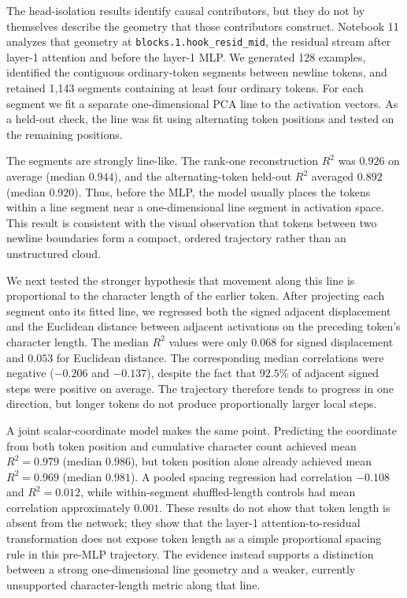 \documentclass[11pt]{article}
\begin{document}
The head-isolation results identify causal contributors, but they do not by
themselves describe the geometry that those contributors construct.  Notebook
11 analyzes that geometry at
\texttt{blocks.1.hook\_resid\_mid}, the residual stream after layer-1
attention and before the layer-1 MLP.  We generated 128 examples, identified
the contiguous ordinary-token segments between newline tokens, and retained
1,143 segments containing at least four ordinary tokens.  For each segment we
fit a separate one-dimensional PCA line to the activation vectors.  As a
held-out check, the line was fit using alternating token positions and tested
on the remaining positions.

The segments are strongly line-like.  The rank-one reconstruction $R^2$ was
$0.926$ on average (median $0.944$), and the alternating-token held-out
$R^2$ averaged $0.892$ (median $0.920$).  Thus, before the MLP, the model
usually places the tokens within a line segment near a one-dimensional line
segment in activation space.  This result is consistent with the visual
observation that tokens between two newline boundaries form a compact,
ordered trajectory rather than an unstructured cloud.

We next tested the stronger hypothesis that movement along this line is
proportional to the character length of the earlier token.  After projecting
each segment onto its fitted line, we regressed both the signed adjacent
displacement and the Euclidean distance between adjacent activations on the
preceding token's character length.  The median $R^2$ values were only
$0.068$ for signed displacement and $0.053$ for Euclidean distance.  The
corresponding median correlations were negative ($-0.206$ and $-0.137$),
despite the fact that $92.5\%$ of adjacent signed steps were positive on
average.  The trajectory therefore tends to progress in one direction, but
longer tokens do not produce proportionally larger local steps.

A joint scalar-coordinate model makes the same point.  Predicting the
coordinate from both token position and cumulative character count achieved
mean $R^2=0.979$ (median $0.986$), but token position alone already achieved
mean $R^2=0.969$ (median $0.981$).  A pooled spacing regression had correlation
$-0.108$ and $R^2=0.012$, while within-segment shuffled-length controls had
mean correlation approximately $0.001$.  These results do not show that
token length is absent from the network; they show that the layer-1
attention-to-residual transformation does not expose token length as a simple
proportional spacing rule in this pre-MLP trajectory.  The evidence instead
supports a distinction between a strong one-dimensional line geometry and a
weaker, currently unsupported character-length metric along that line.
\end{document}
